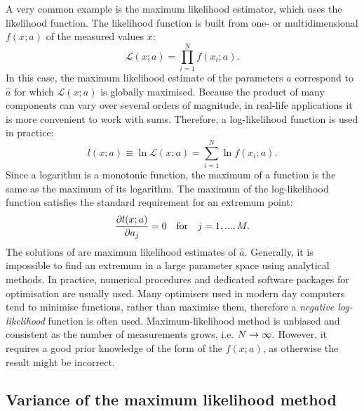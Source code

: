 A very common example is the maximum likelihood estimator, which uses the likelihood function.
The likelihood function is built from one- or multidimensional \PDF $f(x;a)$ of the measured values $x$:
\begin{equation}\label{eq:likelihood_equation}
    \mathcal{L}(x;a) = \prod_{i=1}^N f(x_i; a).
\end{equation}
In this case, the maximum likelihood estimate of the parameters $a$ correspond to $\hat{a}$ for which $\mathcal{L}(x;a)$ is globally maximised.
Because the product of many components can vary over several orders of magnitude, in real-life applications it is more convenient to work with sums.
Therefore, a log-likelihood function is used in practice:
\begin{equation}
    l(x;a) \equiv \ln\mathcal{L}(x;a) = \sum_{i=1}^N \ln f(x_i;a).
\end{equation}
Since a logarithm is a monotonic function, the maximum of a function is the same as the maximum of its logarithm. 
The maximum of the log-likelihood function satisfies the standard requirement for an extremum point:
\begin{equation}\label{eq:likelihood_derivative}
    \pdv{l(x;a)}{a_j}=0 \quad \mathrm{for} \quad j=1,...,M.
\end{equation}
The solutions of  are maximum likelihood estimates of $\hat{a}$. Generally, it is impossible to find an extremum in a large parameter space using analytical methods.
In practice, numerical procedures and dedicated software packages for optimisation are usually used.
Many optimisers used in modern day computers tend to minimise functions, rather than maximise them, therefore a \textit{negative log-likelihood} function is often used.
Maximum-likelihood method is unbiased and consistent as the number of measurements grows, i.e. $N\rightarrow\infty$.
However, it requires a good prior knowledge of the form of the \PDF $f(x;a)$, as otherwise the result might be incorrect.

\subsection{Variance of the maximum likelihood method}\label{sec:mle_variance}

